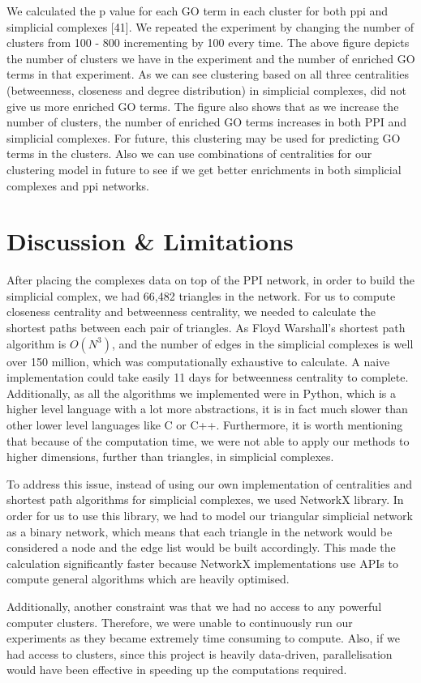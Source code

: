 \documentclass[9pt]{article}
\begin{document}
\par 
We calculated the p value for each GO term in each cluster for both ppi and simplicial complexes [41]. We repeated the experiment by changing the number of clusters from 100 - 800 incrementing by 100 every time. The above figure depicts the number of clusters we have in the experiment and the number of enriched GO terms in that experiment. As we can see clustering based on all three centralities (betweenness, closeness and degree distribution) in simplicial complexes, did not give us more enriched GO terms. The figure also shows that as we increase the number of clusters, the number of enriched GO terms increases in both PPI and simplicial complexes. For future, this clustering may be used for predicting GO terms in the clusters. Also
we can use combinations of centralities for our clustering model in future to see if we get better enrichments in both simplicial complexes and ppi networks.

\section{Discussion \& Limitations} 
After placing the complexes data on top of the PPI network, in order to build the simplicial complex, we had 66,482 triangles in the network. For us to compute closeness centrality and betweenness centrality, we needed to calculate the shortest paths between each pair of triangles. As Floyd Warshall’s shortest path algorithm is \(O(N^3)\), and the number of edges in the simplicial complexes is well over 150 million, which was computationally exhaustive to calculate. A naive implementation could take easily 11 days for betweenness centrality to complete. Additionally, as all the algorithms we implemented were in Python, which is a higher level language with a lot more abstractions, it is in fact much slower than other lower level languages like C or C++. Furthermore, it is worth mentioning that because of the computation time, we were not able to apply our methods to higher dimensions, further than triangles, in simplicial complexes.
\par
To address this issue, instead of using our own implementation of centralities and shortest path algorithms for simplicial complexes, we used NetworkX library. In order for us to use this library, we had to model our triangular simplicial network as a binary network, which means that each triangle in the network would be considered a node and the edge list would be built accordingly. This made the calculation significantly faster because NetworkX implementations use APIs to compute general algorithms which are heavily optimised.
\par
Additionally, another constraint was that we had no access to any powerful computer clusters. Therefore, we were unable to continuously run our experiments as they became extremely time consuming to compute. Also, if we had access to clusters, since this project is heavily data-driven, parallelisation would have been effective in speeding up the computations required.  
\end{document}
